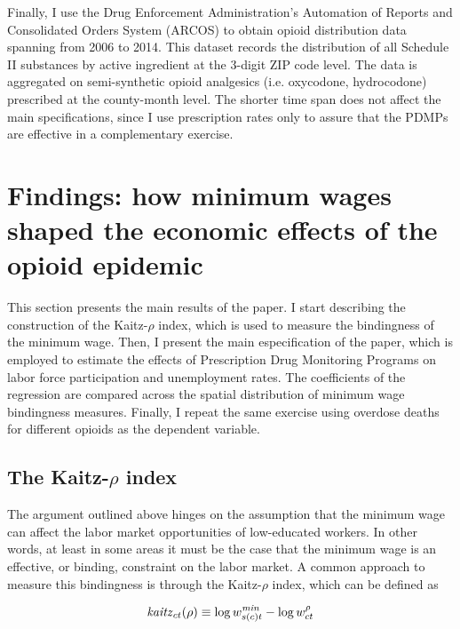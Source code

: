 \documentclass[12pt,a4paper]{article}
\begin{document}
Finally, I use the Drug Enforcement Administration's Automation of Reports and Consolidated Orders System (ARCOS) to obtain opioid distribution data spanning from 2006 to 2014.
This dataset records the distribution of all Schedule II substances by active ingredient at the 3-digit ZIP code level.
The data is aggregated on semi-synthetic opioid analgesics (i.e. oxycodone, hydrocodone) prescribed at the county-month level.
The shorter time span does not affect the main specifications, since I use prescription rates only to assure that the PDMPs are effective in a complementary exercise.

\section*{Findings: how minimum wages shaped the economic effects of the opioid epidemic}

This section presents the main results of the paper. 
I start describing the construction of the Kaitz-\(\rho\) index, which is used to measure the bindingness of the minimum wage.
Then, I present the main especification of the paper, which is employed to estimate the effects of Prescription Drug Monitoring Programs on labor force participation and unemployment rates.
The coefficients of the regression are compared across the spatial distribution of minimum wage bindingness measures.
Finally, I repeat the same exercise using overdose deaths for different opioids as the dependent variable.

\subsection*{The Kaitz-\(\rho\) index}

The argument outlined above hinges on the assumption that the minimum wage can affect the labor market opportunities of low-educated workers.
In other words, at least in some areas it must be the case that the minimum wage is an effective, or binding, constraint on the labor market.
A common approach to measure this bindingness is through the Kaitz-\(\rho\) index, which can be defined as

\begin{equation}
    \text{\textit{kaitz}}_{ct}(\rho) \equiv \log{w^{\text{\textit{min}}}_{s(c)t}} - \log{w^{\rho}_{ct}}
\end{equation}
\end{document}
